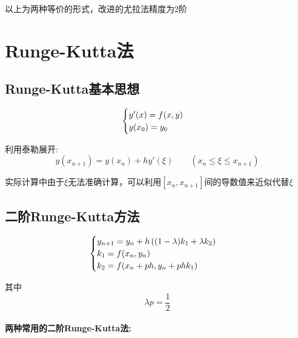 \documentclass[12pt]{report}
\begin{document}
以上为两种等价的形式，改进的尤拉法精度为2阶


\section{Runge-Kutta法}

\subsection{Runge-Kutta基本思想}

\begin{equation}
	\notag
	\begin{cases}
		y^{\prime}(x) = f(x, y) \\ 
		y(x_0) = y_0
	\end{cases}
\end{equation}

利用泰勒展开:
\[
	y(x_{n+1}) = y(x_n) + hy'(\xi) \qquad (x_n \le \xi \le x_{n+1})
\]

实际计算中由于$\xi$无法准确计算，可以利用$[x_n,x_{n+1}]$间的导数值来近似代替$\xi$

\subsection{二阶Runge-Kutta方法}

\begin{equation}
	\begin{cases}
		y_{n+1} = y_n + h\left((1 - \lambda)k_1 + \lambda k_2\right) \\
		k_1 = f(x_n, y_n) \\
		k_2 = f(x_{n}+ph, y_{n}+phk_1)
	\end{cases}
	\notag
\end{equation}

其中
\[
	\lambda p = \frac{1}{2}
\]

\paragraph{两种常用的二阶Runge-Kutta法:}
\end{document}
